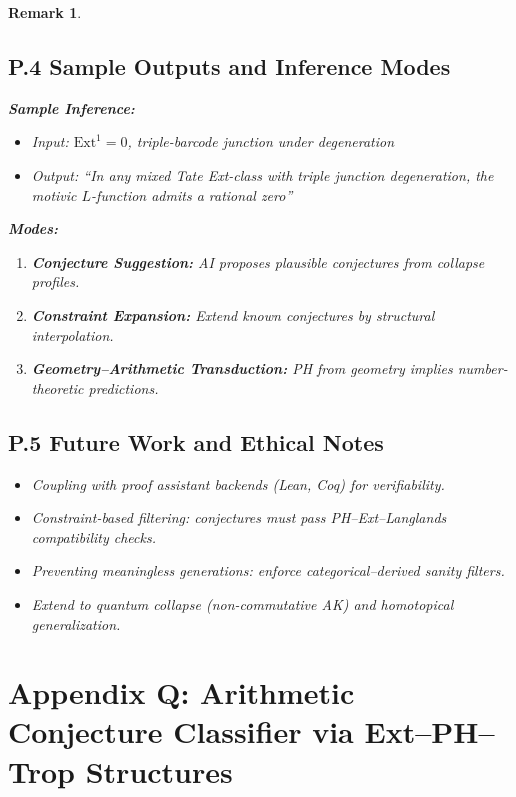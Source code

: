 \documentclass[11pt]{article}
\newtheorem{remark}[theorem]{Remark}
\begin{document}
\begin{remark}
\subsection*{P.4 Sample Outputs and Inference Modes}

\textbf{Sample Inference:}

\begin{itemize}
  \item Input: \( \mathrm{Ext}^1 = 0 \), triple-barcode junction under degeneration
  \item Output: “In any mixed Tate Ext-class with triple junction degeneration, the motivic $L$-function admits a rational zero”
\end{itemize}

\textbf{Modes:}
\begin{enumerate}
  \item \textbf{Conjecture Suggestion:} AI proposes plausible conjectures from collapse profiles.
  \item \textbf{Constraint Expansion:} Extend known conjectures by structural interpolation.
  \item \textbf{Geometry–Arithmetic Transduction:} PH from geometry implies number-theoretic predictions.
\end{enumerate}

\subsection*{P.5 Future Work and Ethical Notes}

\begin{itemize}
  \item Coupling with proof assistant backends (Lean, Coq) for verifiability.
  \item Constraint-based filtering: conjectures must pass PH–Ext–Langlands compatibility checks.
  \item Preventing meaningless generations: enforce categorical–derived sanity filters.
  \item Extend to quantum collapse (non-commutative AK) and homotopical generalization.
\end{itemize}



\section*{Appendix Q: Arithmetic Conjecture Classifier via Ext–PH–Trop Structures}


\end{remark}
\end{document}
